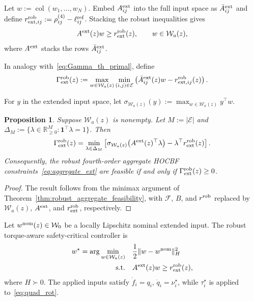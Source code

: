 \documentclass[journal,twoside,web]{ieeecolor}
\newtheorem{proposition}[theorem]{Proposition}
\begin{document}
Let $w:=\operatorname{col}(w_1,\ldots,w_N)$. Embed $A_{ij}^{\rm ext}$ into the full input
space as $\bar A_{ij}^{\rm ext}$ and define
$r_{{\rm ext},ij}^{\rm rob}
:=\rho_{ij}^{(4)}-\ell_{ij}^{\mathrm{ref}}$.
Stacking the robust inequalities gives
\begin{equation}
    A^{\rm ext}(z)w
    \ge
    r_{\rm ext}^{\rm rob}(z),
    \qquad
    w\in\mathcal W_a(z),
    \label{eq:aggregate_ext}
\end{equation}
where $A^{\rm ext}$ stacks the rows $\bar A_{ij}^{\rm ext}$.

In analogy with~\eqref{eq:Gamma_th_primal}, define
\begin{equation}
    \Gamma_{\rm ext}^{\rm rob}(z)
    :=
    \max_{w\in\mathcal W_a(z)}
    \min_{(i,j)\in\mathcal E}
    \left(
        \bar A_{ij}^{\rm ext}(z)w
        -
        r_{{\rm ext},ij}^{\rm rob}(z)
    \right).
    \label{eq:Gamma_ext}
\end{equation}

For $y$ in the extended input space, let
$\sigma_{\mathcal W_a(z)}(y):=
\max_{w\in\mathcal W_a(z)} y^\top w$.

\begin{proposition}
\label{prop:extended_feasibility}
Suppose $\mathcal W_a(z)$ is nonempty. Let
$M:=|\mathcal E|$ and
$\Delta_M:=\{\lambda\in\mathbb R_{\ge0}^M:\mathbf 1^\top\lambda=1\}$.
Then
\begin{equation}
\Gamma_{\rm ext}^{\rm rob}(z)
=
\min_{\lambda\in\Delta_M}
\left[
    \sigma_{\mathcal W_a(z)}
    \big(A^{\rm ext}(z)^\top\lambda\big)
    -
    \lambda^\top r_{\rm ext}^{\rm rob}(z)
\right].
\label{eq:Gamma_ext_dual}
\end{equation}
Consequently, the robust fourth-order aggregate HOCBF
constraints~\eqref{eq:aggregate_ext} are feasible if and only if
$\Gamma_{\rm ext}^{\rm rob}(z)\ge0$.
\end{proposition}

\begin{proof}
The result follows from the minimax argument of
Theorem~\ref{thm:robust_aggregate_feasibility}, with
$\mathcal F$, $B$, and $r^{\rm rob}$ replaced by
$\mathcal W_a(z)$, $A^{\rm ext}$, and $r_{\rm ext}^{\rm rob}$,
respectively.
\end{proof}

Let $w^{\rm nom}(z)\in\mathcal W_0$ be a locally Lipschitz
nominal extended input. The robust torque-aware safety-critical controller is
\begin{equation}
\begin{aligned}
    w^\star
    =\arg\min_{w\in\mathcal W_a(z)}\quad&
    \frac12\|w-w^{\rm nom}\|_{H}^{2}\\
    {\rm s.t.}\quad&
    A^{\rm ext}(z)w\ge r_{\rm ext}^{\rm rob}(z),
\end{aligned}
\label{eq:extended_qp}
\end{equation}
where $H\succ0$. The applied inputs satisfy
$\dot f_i=q_i$, $\dot q_i=\nu_i^\star$, while
$\tau_i^\star$ is applied to~\eqref{eq:quad_rot}.
\end{document}

